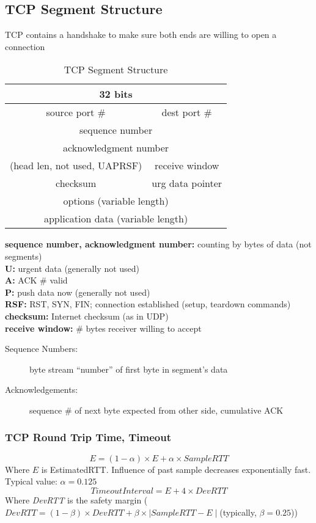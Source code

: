 \subsection{TCP Segment Structure}
\begin{leftbar}
	TCP contains a handshake to make sure both ends are willing to open a connection
\end{leftbar}
\begin{table}[H]
	\centering
	\caption{TCP Segment Structure}
	\begin{tabular}{cc}
		\toprule
		\multicolumn{2}{c}{32 bits}\\
		\midrule
		source port \# & dest port \#\\
		\multicolumn{2}{c}{sequence number}\\
		\multicolumn{2}{c}{acknowledgment number}\\
		(head len, not used, UAPRSF) & receive window\\
		checksum & urg data pointer\\
		\multicolumn{2}{c}{options (variable length)}\\
		\multicolumn{2}{c}{application data (variable length)}\\
		\bottomrule
	\end{tabular}
\end{table}
\begin{leftbar}
	\textbf{sequence number, acknowledgment number:} counting by bytes of data (not segments)\\
	\textbf{U:} urgent data (generally not used)\\
	\textbf{A:} ACK \# valid\\
	\textbf{P:} push data now (generally not used)\\
	\textbf{RSF:} RST, SYN, FIN; connection established (setup, teardown commands)\\
	\textbf{checksum:} Internet checksum (as in UDP)\\
	\textbf{receive window:} \# bytes receiver willing to accept
\end{leftbar}
\begin{description}
	\item[Sequence Numbers:] byte stream ``number'' of first byte in segment's data
	\item[Acknowledgements:] sequence \# of next byte expected from other side, cumulative ACK
\end{description}
\subsubsection{TCP Round Trip Time, Timeout}
$$ E = (1-\alpha)\times E+\alpha\times\textit{SampleRTT} $$
Where $E$ is EstimatedRTT. Influence of past sample decreases exponentially fast. Typical value: $\alpha = 0.125$
$$ \textit{TimeoutInterval} = E + 4\times\textit{DevRTT} $$
Where \textit{DevRTT} is the safety margin ($ \textit{DevRTT} = (1-\beta)\times\textit{DevRTT}+\beta\times\mid\textit{SampleRTT}-E\mid $(typically, $\beta=0.25$))
